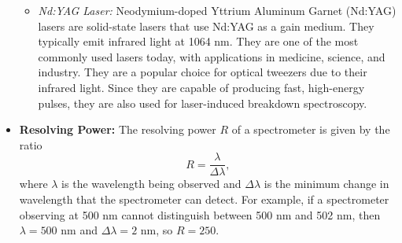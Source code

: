 \documentclass[%
 reprint,
superscriptaddress,
 amsmath,amssymb,
 aps,
prc,
]{revtex4-1}
\begin{document}
\begin{itemize}
\begin{itemize}
		\item \textit{Nd:YAG Laser:} Neodymium-doped Yttrium Aluminum Garnet (Nd:YAG) lasers are solid-state lasers that use Nd:YAG as a gain medium. They typically emit infrared light at 1064 nm. They are one of the most commonly used lasers today, with applications in medicine, science, and industry. They are a popular choice for optical tweezers due to their infrared light. Since they are capable of producing fast, high-energy pulses, they are also used for laser-induced breakdown spectroscopy.
	\end{itemize}

	\item \textbf{Resolving Power:} The resolving power $R$ of a spectrometer is given by the ratio
	\begin{equation}
		R = \frac{\lambda}{\Delta\lambda},
	\end{equation}
	where $\lambda$ is the wavelength being observed and $\Delta\lambda$ is the minimum change in wavelength that the spectrometer can detect. For example, if a spectrometer observing at 500 nm cannot distinguish between 500 nm and 502 nm, then $\lambda = 500$ nm and $\Delta\lambda = 2$ nm, so $R = 250$.
\end{itemize}
\end{document}
